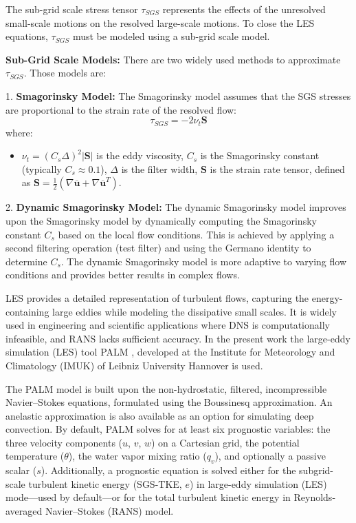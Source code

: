 The sub-grid scale stress tensor $\tau_{SGS}$ represents the effects of the unresolved small-scale motions on the resolved large-scale motions. To close the LES equations, $\tau_{SGS}$ must be modeled using a sub-grid scale model.

\textbf{Sub-Grid Scale Models:}
There are two widely used methods to approximate $\tau_{SGS}$. Those models are:

1. \textbf{Smagorinsky Model:}
   The Smagorinsky model assumes that the SGS stresses are proportional to the strain rate of the resolved flow:
   \begin{equation}
   \tau_{SGS} = -2 \nu_t \mathbf{S}
   \end{equation}
   where:
   \begin{itemize}
       \item $\nu_t = (C_s \Delta)^2 |\mathbf{S}|$ is the eddy viscosity, $C_s$ is the Smagorinsky constant (typically $C_s \approx 0.1$), $\Delta$ is the filter width, $\mathbf{S}$ is the strain rate tensor, defined as $\mathbf{S} = \frac{1}{2} \left( \nabla \overline{\mathbf{u}} + \nabla \overline{\mathbf{u}}^T \right)$.
   \end{itemize}

2. \textbf{Dynamic Smagorinsky Model:}
   The dynamic Smagorinsky model improves upon the Smagorinsky model by dynamically computing the Smagorinsky constant $C_s$ based on the local flow conditions. 
   This is achieved by applying a second filtering operation (test filter) and using the Germano identity to determine $C_s$.
    The dynamic Smagorinsky model is more adaptive to varying flow conditions and provides better results in complex flows.

LES provides a detailed representation of turbulent flows, capturing the energy-containing large eddies while modeling the dissipative small scales. It is widely used in engineering and scientific applications where DNS is computationally infeasible, and RANS lacks sufficient accuracy. In the present work the
large-eddy simulation (LES) tool PALM \cite{maronga2015}, developed at the Institute for Meteorology and
Climatology (IMUK) of Leibniz University Hannover is used. 

The PALM model is built upon the non-hydrostatic, filtered, incompressible Navier–Stokes equations, formulated using the Boussinesq approximation. An anelastic approximation is also available as an option for simulating deep convection. By default, PALM solves for at least six prognostic variables: the three velocity components ($u$, $v$, $w$) on a Cartesian grid, the potential temperature ($\theta$), the water vapor mixing ratio ($q_v$), and optionally a passive scalar ($s$). Additionally, a prognostic equation is solved either for the subgrid-scale turbulent kinetic energy (SGS-TKE, $e$) in large-eddy simulation (LES) mode—used by default—or for the total turbulent kinetic energy in Reynolds-averaged Navier–Stokes (RANS) model.

